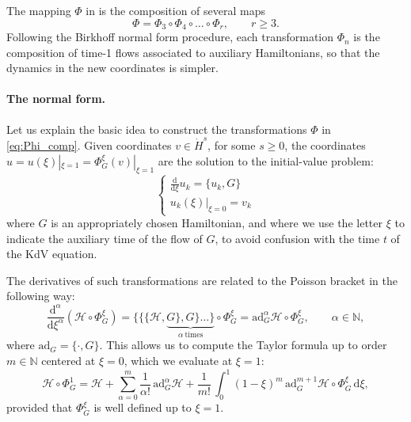 \documentclass[a4paper,10pt,reqno]{article}
\theoremstyle{definition}
\theoremstyle{plain}
\theoremstyle{plain}
\theoremstyle{definition}
\theoremstyle{plain}
\theoremstyle{plain}
\theoremstyle{plain}
\theoremstyle{definition}
\theoremstyle{definition}
\def \N{\mathbb N}
\def \H{\mathcal{H}}
\begin{document}
\medskip

The mapping $\Phi$ in  is the composition of several maps 
\begin{equation}\label{eq:Phi_comp}
    \Phi=\Phi_3 \circ \Phi_{4} \circ \ldots \circ \Phi_r, \qquad r\geq 3.
\end{equation}
Following the Birkhoff normal form procedure, each transformation $\Phi_n$ is the composition of time-1 flows associated to auxiliary Hamiltonians, so that the dynamics in the new coordinates is simpler. 

\paragraph{The normal form.}\label{subsection: the normal form}
Let us explain the basic idea to construct the transformations $\Phi$ in \eqref{eq:Phi_comp}. 
Given coordinates $v\in \dot{H}^s$, for some $s\geq 0$, the coordinates $u=u(\xi)|_{\xi=1}=\Phi_G^{\xi}(v)|_{\xi=1}$ are the solution to the initial-value problem:
\[
\begin{cases}
\frac{\mathrm{d}}{\mathrm{d} \xi} u_k = \{ u_k,G \} \\
u_k (\xi)|_{\xi=0} = v_k
\end{cases}
\]
where $G$ is an appropriately chosen Hamiltonian, and where we use the letter $\xi$ to indicate the auxiliary time of the flow of $G$, to avoid confusion with the time $t$ of the KdV equation.

The derivatives of such transformations are related to the Poisson bracket in the following way:
\[
\frac{\mathrm{d}^{\alpha}}{\mathrm{d}\xi^{\alpha}}(\H \circ \Phi_G^{\xi}) =  \{ \{ \{ \H, \underbrace{G \}, G \}\ldots\}}_{\alpha\ \mathrm{times}} \circ \Phi_G^{\xi} = \mathrm{ad}_G^{\alpha} \H \circ \Phi_G^{\xi}, \qquad \alpha\in\N,
\]
where $\mathrm{ad}_{G} = \{ \cdot, G \}$.
This allows us to compute the Taylor formula up to order $m\in\N$ centered at $\xi = 0$, which we evaluate at $\xi=1$:
\begin{equation}
\H \circ \Phi_G^1 = \H + \sum_{\alpha=0}^{m} \frac{1}{\alpha!}  \,\mathrm{ad}_G^{\alpha} \H + \frac{1}{m!} \, \int_0^1 (1-\xi)^m \,\mathrm{ad}_{G}^{m+1} \H \circ \Phi_G^{\xi} \, \mathrm{d} \xi,
\label{eq: taylor formula for Hnew integral remainder}
\end{equation}
provided that $\Phi_G^{\xi}$ is well defined up to $\xi=1$. 
\end{document}
